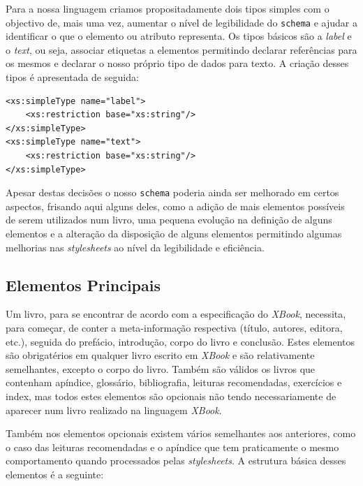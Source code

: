 \documentclass[a4paper]{article}
\begin{document}
\hspace{1cm}Para a nossa linguagem criamos propositadamente dois tipos simples com o objectivo de, mais uma vez, aumentar o nível de legibilidade do \verb|schema| e ajudar a identificar o que o elemento ou atributo representa. Os tipos básicos são a \emph{label} e o \emph{text}, ou seja, associar etiquetas a elementos permitindo declarar referências para os mesmos e declarar o nosso próprio tipo de dados para texto. A criação desses tipos é apresentada de seguida:\\
          
\begin{small}
\begin{lstlisting}
<xs:simpleType name="label">
    <xs:restriction base="xs:string"/>
</xs:simpleType>
<xs:simpleType name="text">
    <xs:restriction base="xs:string"/>
</xs:simpleType>
\end{lstlisting}
\end{small}      

\hspace{1cm}Apesar destas decisões o nosso \verb|schema| poderia ainda ser melhorado em certos aspectos, frisando aqui alguns deles, como a adição de mais elementos possíveis de serem utilizados num livro, uma pequena evolução na definição de alguns elementos e a alteração da disposição de alguns elementos permitindo algumas melhorias nas \emph{stylesheets} ao nível da legibilidade e eficiência.\\

\subsection{\large Elementos Principais}

\hspace{1cm}Um livro, para se encontrar de acordo com a especificação do \emph{XBook}, necessita, para começar, de conter a meta-informação respectiva (título, autores, editora, etc.), seguida do prefácio, introdução, corpo do livro e conclusão. Estes elementos são obrigatérios em qualquer livro escrito em \emph{XBook} e são relativamente semelhantes, excepto o corpo do livro. Também são válidos os livros que contenham apíndice, glossário, bibliografia, leituras recomendadas, exercícios e index, mas todos estes elementos são opcionais não tendo necessariamente de aparecer num livro realizado na linguagem \emph{XBook}.

\hspace{1cm}Também nos elementos opcionais existem vários semelhantes aos anteriores, como o caso das leituras recomendadas e o apíndice que tem praticamente o mesmo comportamento quando processados pelas \emph{stylesheets}. A estrutura básica desses elementos é a seguinte:\\
\end{document}
